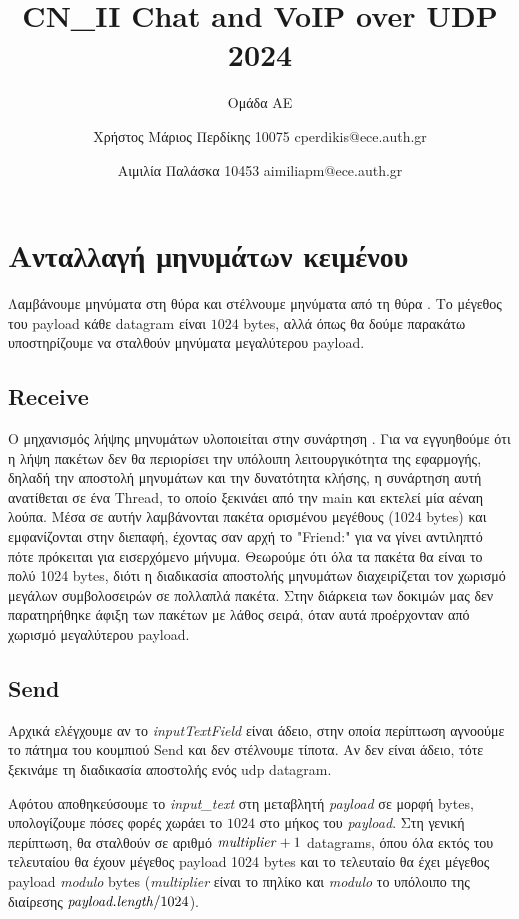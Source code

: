 \documentclass{article}
\title{CN\_II Chat and VoIP over UDP 2024}
\author{Ομάδα ΑΕ%
   \and Χρήστος Μάριος Περδίκης 10075 cperdikis@ece.auth.gr
   \and Αιμιλία Παλάσκα 10453 aimiliapm@ece.auth.gr}
\date{}
\begin{document}
\maketitle


\section{Ανταλλαγή μηνυμάτων κειμένου}
Λαμβάνουμε μηνύματα στη θύρα \textdestport{} και στέλνουμε μηνύματα από τη θύρα 
\textdestport. Το μέγεθος του payload κάθε datagram είναι $1024$ bytes, αλλά όπως θα 
δούμε παρακάτω υποστηρίζουμε να σταλθούν μηνύματα μεγαλύτερου payload.

\subsection{Receive}
Ο μηχανισμός λήψης μηνυμάτων υλοποιείται στην συνάρτηση .
Για να εγγυηθούμε ότι η λήψη πακέτων δεν θα περιορίσει την υπόλοιπη λειτουργικότητα της
εφαρμογής, δηλαδή την αποστολή μηνυμάτων και την δυνατότητα κλήσης, η συνάρτηση αυτή
ανατίθεται σε ένα Thread, το οποίο ξεκινάει από την main και εκτελεί μία αέναη λούπα. 
Μέσα σε αυτήν λαμβάνονται πακέτα ορισμένου μεγέθους (1024 bytes) και εμφανίζονται στην
διεπαφή, έχοντας σαν αρχή το "Friend:" για να γίνει αντιληπτό πότε πρόκειται για εισερχόμενο
μήνυμα. Θεωρούμε ότι όλα τα πακέτα θα είναι το πολύ 1024 bytes, διότι η διαδικασία
αποστολής μηνυμάτων διαχειρίζεται τον χωρισμό μεγάλων συμβολοσειρών σε πολλαπλά πακέτα.
Στην διάρκεια των δοκιμών μας δεν παρατηρήθηκε άφιξη των πακέτων με λάθος σειρά, όταν αυτά
προέρχονταν από χωρισμό μεγαλύτερου payload. 

\subsection{Send}
Αρχικά ελέγχουμε αν το \textit{inputTextField} είναι άδειο, στην οποία 
περίπτωση αγνοούμε το πάτημα του κουμπιού Send και δεν στέλνουμε τίποτα. 
Αν δεν είναι άδειο, τότε ξεκινάμε τη διαδικασία αποστολής ενός udp datagram.

Αφότου αποθηκεύσουμε το \textit{input\_text} στη μεταβλητή 
\textit{payload} σε μορφή bytes, υπολογίζουμε πόσες φορές χωράει το
$1024$ στο μήκος του \textit{payload}. Στη γενική περίπτωση, θα σταλθούν σε αριθμό
$\text{\textit{multiplier}} + 1$ datagrams, όπου όλα εκτός του τελευταίου
θα έχουν μέγεθος payload 1024 bytes και το τελευταίο θα έχει μέγεθος payload \textit{modulo}
bytes (\textit{multiplier} είναι το πηλίκο και \textit{modulo} το υπόλοιπο
της διαίρεσης $\text{\textit{payload.length}} / 1024$).
\end{document}
